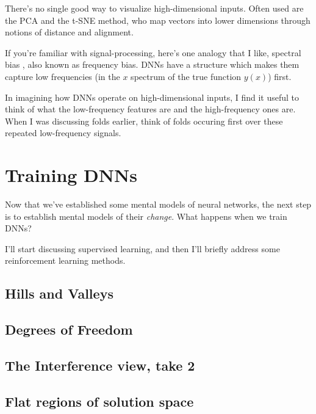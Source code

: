 There's no single good way to visualize high-dimensional inputs. Often used are the PCA and the t-SNE method, who map vectors into lower dimensions through notions of distance and alignment.

If you're familiar with signal-processing, here's one analogy that I like, spectral bias \citep{rahaman2018spectral}, also known as frequency bias. DNNs have a structure which makes them capture low frequencies (in the $x$ spectrum of the true function $y(x)$) first.

In imagining how DNNs operate on high-dimensional inputs, I find it useful to think of what the low-frequency features are and the high-frequency ones are. When I was discussing folds earlier, think of folds occuring first over these repeated low-frequency signals.

\section{Training DNNs}

Now that we've established some mental models of neural networks, the next step is to establish mental models of their \emph{change}. What happens when we train DNNs?

I'll start discussing supervised learning, and then I'll briefly address some reinforcement learning methods.

\subsection{Hills and Valleys}



\subsection{Degrees of Freedom}

\subsection{The Interference view, take 2}

\subsection{Flat regions of solution space}